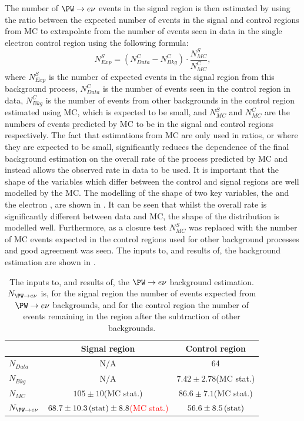 The number of $\PW\rightarrow e\nu$ events in the signal region is then estimated by using the ratio between the expected number of events in the signal and control regions from \ac{MC} to extrapolate from the number of events seen in data in the single electron control region using the following formula:
\begin{equation}
  \label{eq:wdatabkg}
  N^{S}_{Exp}=\left(N^{C}_{Data}-N^{C}_{Bkg}\right)\cdot\frac{N^{S}_{MC}}{N^{C}_{MC}},
\end{equation}
where $N^{S}_{Exp}$ is the number of expected events in the signal region from this background process, $N^{C}_{Data}$ is the number of events seen in the control region in data, $N^{C}_{Bkg}$ is the number of events from other backgrounds in the control region estimated using \ac{MC}, which is expected to be small, and $N^{S}_{MC}$ and $N^{C}_{MC}$ are the numbers of events predicted by \ac{MC} to be in the signal and control regions respectively. The fact that estimations from \ac{MC} are only used in ratios, or where they are expected to be small, significantly reduces the dependence of the final background estimation on the overall rate of the process predicted by \ac{MC} and instead allows the observed rate in data to be used. It is important that the shape of the variables which differ between the control and signal regions are well modelled by the \ac{MC}. The modelling of the shape of two key variables, the \METnoMU and the electron \pt, are shown in . It can be seen that whilst the overall rate is significantly different between data and \ac{MC}, the shape of the distribution is modelled well. Furthermore, as a closure test $N^{S}_{MC}$ was replaced with the number of \ac{MC} events expected in the control regions used for other background processes and good agreement was seen. The inputs to, and results of, the background estimation are shown in .

\begin{table}
  \caption{The inputs to, and results of, the $\PW\rightarrow e\nu$ background estimation. $N_{\PW\rightarrow e\nu}$ is, for the signal region the number of events expected from $\PW\rightarrow e\nu$ backgrounds, and for the control region the number of events remaining in the region after the subtraction of other backgrounds.}
  \label{tab:promptwenu}
  \begin{tabular}{lcc}
    \hline
    \hline
    & Signal region & Control region \\
    \hline
    \hline
    $N_{Data}$ & N/A & 64\\
    $N_{Bkg}$ & N/A & $7.42\pm2.78$(\ac{MC} stat.) \\
    $N_{MC}$& $105\pm10$(\ac{MC} stat.) & $86.6\pm 7.1$(\ac{MC} stat.) \\
    \hline
    $N_{\PW\rightarrow e\nu}$& \textcolor{red}{$68.7\pm 10.3\,\text{(stat)}\pm 8.8$(MC stat.)} & $56.6\pm 8.5\,\text{(stat)}$ \\
    \hline
    \hline
  \end{tabular}
\end{table}

